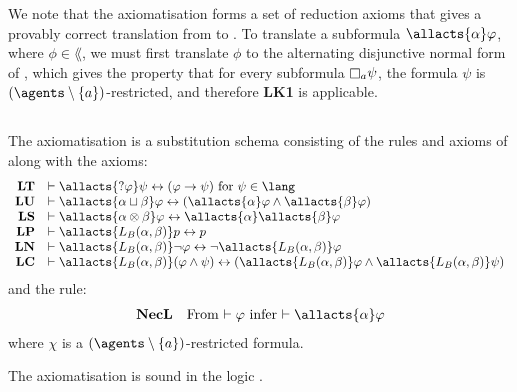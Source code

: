 We note that the axiomatisation \axiomAflKFF{} forms a set of reduction axioms that gives a provably correct translation from \langAfl{} to \lang{}.
To translate a subformula $\allacts{\alpha} \phi$, where $\phi \in \lang$, we must first translate $\phi$ to the alternating disjunctive normal form of \cite{hales:2012}, which gives the property that for every subformula $\necessaryA \psi$, the formula $\psi$ is $(\agents \setminus \{\agentA\})$-restricted, and therefore {\bf LK1} is applicable.

\subsection{\classS{}}

\begin{definition}\label{afl-s-axioms}
The axiomatisation \axiomAflS{} is a substitution schema consisting of the rules and axioms of \axiomS{} along with the axioms:
$$
\begin{array}{rl}
    {\bf LT} & \proves \allacts{\test{\phi}} \psi \iff (\phi \implies \psi) \text{ for } \psi \in \lang\\
    {\bf LU} & \proves \allacts{\alpha \choice \beta} \phi \iff (\allacts{\alpha} \phi \land \allacts{\beta} \phi)\\
    {\bf LS} & \proves \allacts{\alpha \compose \beta} \phi \iff \allacts{\alpha} \allacts{\beta} \phi\\
    {\bf LP} & \proves \allacts{\learns_\agentsB (\alpha, \beta)} \atomP \iff \atomP\\
    {\bf LN} & \proves \allacts{\learns_\agentsB (\alpha, \beta)} \neg \phi \iff \neg \allacts{\learns_\agentsB (\alpha, \beta)} \phi\\
    {\bf LC} & \proves \allacts{\learns_\agentsB (\alpha, \beta)} (\phi \land \psi) \iff (\allacts{\learns_\agentsB (\alpha, \beta)} \phi \land \allacts{\learns_\agentsB (\alpha, \beta)} \psi)\\
\end{array}
$$
and the rule:
$$
\begin{array}{rl}
    {\bf NecL} & \text{From $\proves \phi$ infer $\proves \allacts{\alpha} \phi$}
\end{array}
$$
where $\chi$ is a $(\agents \setminus \{\agentA\})$-restricted formula.
\end{definition}

\begin{proposition}\label{afl-s-axioms-soundness}
The axiomatisation \axiomAflS{} is sound in the logic \logicAmlS{}.
\end{proposition}

